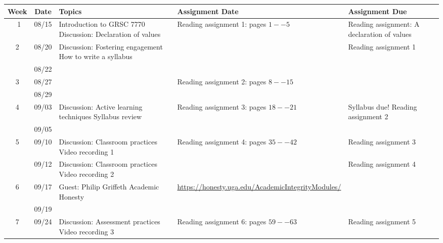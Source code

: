 \begin{longtable}{ |c|c|p{10em}|p{10em}|p{10em}| }
  \hline
  \textbf{Week} & \textbf{Date} & \textbf{Topics} & \textbf{Assignment Date} & \textbf{Assignment Due} \\
  \hline\ 
  1 & 08/15 & {Introduction to GRSC 7770 Discussion: Declaration of values} 
            & {Reading assignment 1:  pages $1--5$}
            & {Reading assignment:  A declaration of values} \\  \hline
  
  2 & 08/20 &  {Discussion: Fostering engagement How to write a syllabus}
            &
            & {Reading assignment 1}  \\ \hline
  
    & 08/22 &  {} & & {}  \\ \hline

  3 & 08/27 & 
            & {Reading assignment 2: pages $8--15$} 
            & \\ \hline

    & 08/29 &  {} & & {} \\ \hline

  4 & 09/03 &  {Discussion: Active learning techniques Syllabus review} 
            & {Reading assignment 3: pages $18--21$} 
            & {Syllabus due! Reading assignment 2}\\ \hline

    & 09/05 &  {} & {} & {}\\ \hline


  5 & 09/10 & {Discussion: Classroom practices Video recording 1}
            & {Reading assignment 4: pages $35--42$} 
            & {Reading assignment 3} \\ \hline 
  
    & 09/12 & {Discussion:  Classroom practices Video recording 2} 
            & {}
            & {Reading assignment 4} \\ \hline

  6 & 09/17 &  {Guest: Philip Griffeth Academic Honesty} 
            &  {\url{https://honesty.uga.edu/AcademicIntegrityModules/}}
            &  {} \\ \hline

    & 09/19 &  {}  & {} & {} \\ \hline

  7 & 09/24 &  {Discussion: Assessment practices Video recording 3} 
            & {Reading assignment 6: pages $59--63$} 
            & {Reading assignment 5} \\ \hline


\end{longtable}
